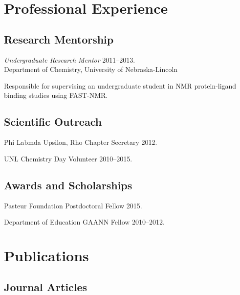 \documentclass[letterpaper]{article}
\renewenvironment{itemize}{
  \begin{list}{}{
    \setlength{\leftmargin}{1.5em}
  }
}{
  \end{list}
}
\begin{document}
\section*{Professional Experience}

\subsection*{Research Mentorship}

\begin{itemize}
\item{
  {\it Undergraduate Research Mentor}
  \hfill 2011--2013. \\
  Department of Chemistry, University of Nebraska-Lincoln
  \begin{enumerate*}
    \item Responsible for supervising an undergraduate student in NMR
      protein-ligand binding studies using FAST-NMR.
  \end{enumerate*}
}
\end{itemize}

\subsection*{Scientific Outreach}

\begin{itemize}
\item Phi Labmda Upsilon, Rho Chapter Secretary \hfill 2012.
\item UNL Chemistry Day Volunteer \hfill 2010--2015.
\end{itemize}

\subsection*{Awards and Scholarships}

\begin{itemize}
\item Pasteur Foundation Postdoctoral Fellow \hfill 2015.
\item Department of Education GAANN Fellow \hfill 2010--2012.
\end{itemize}


\section*{Publications}

\subsection*{Journal Articles}
\end{document}
